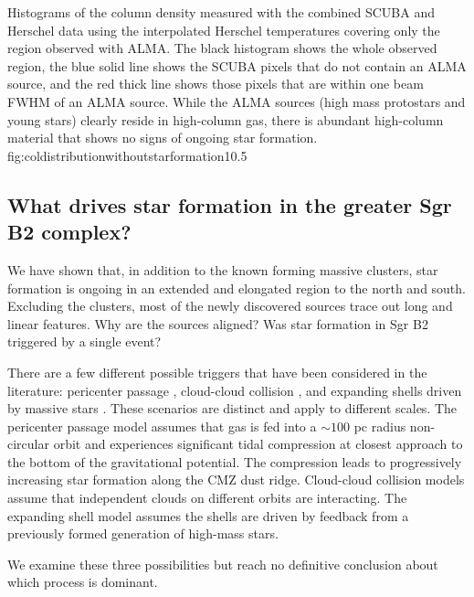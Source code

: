 \documentclass[twocolumn]{aastex61}
\begin{document}
{Histograms of the column density measured with the combined SCUBA and Herschel
data using the interpolated Herschel temperatures covering only the region
observed with ALMA.  The black histogram shows the whole observed region,
the blue solid line shows the SCUBA pixels that do not contain an ALMA source,
and the red thick line shows those pixels that are within one beam
FWHM of an ALMA source.  While the ALMA sources (high mass protostars and young
stars)
clearly reside in high-column gas, there is abundant high-column material
that shows no signs of ongoing star formation.}
{fig:coldistributionwithoutstarformation}{1}{0.5\textwidth}

\subsection{What drives star formation in the greater Sgr B2 complex?}
\label{sec:whatdrives}
We have shown that, in addition to the known forming massive clusters,
star formation is ongoing in an extended and elongated region to the north
and south.  Excluding the clusters, most of the newly discovered sources
trace out long and linear features.  Why are the sources aligned?
Was star formation in Sgr B2 triggered by a single event?

There are a few different possible triggers that have been considered in the
literature: pericenter passage \citep{Longmore2013a,Kruijssen2015a},
cloud-cloud collision
\citep{Hasegawa1994a,Mehringer1997a,Sato2000a}, and expanding shells driven by
massive stars \citep{Martin-Pintado1999a}.  These scenarios are distinct and
apply to different scales.  The pericenter passage model assumes that gas is
fed into a $\sim100$ pc radius non-circular orbit and experiences significant
tidal compression at closest approach to the bottom of the gravitational
potential.  The compression leads to progressively increasing star formation
along the CMZ dust ridge.  Cloud-cloud collision models assume that independent
clouds on different orbits are interacting.  The expanding shell model assumes
the shells are driven by feedback from a previously formed generation of
high-mass stars.

We examine these three possibilities but reach no definitive conclusion about
which process is dominant.
\end{document}
